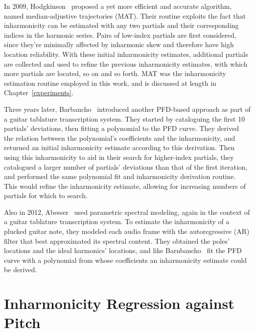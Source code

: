 \documentclass[12pt]{cmuthesis}
\begin{document}
In 2009, Hodgkinson~\cite{hodgkinson2009} proposed a yet more efficient and accurate algorithm, named median-adjustive trajectories (MAT). Their routine exploits the fact that inharmonicity can be estimated with any two partials and their corresponding indices in the harmonic series. Pairs of low-index partials are first considered, since they're minimally affected by inharmonic skew and therefore have high location reliability. With these initial inharmonicity estimates, additional partials are collected and used to refine the previous inharmonicity estimates, with which more partials are located, so on and so forth. MAT was the inharmonicity estimation routine employed in this work, and is discussed at length in Chapter~\ref{experiments}.

Three years later, Barbancho~\cite{barbanchoi2012} introduced another PFD-based approach as part of a guitar tablature transcription system. They started by cataloguing the first 10 partials' deviations, then fitting a polynomial to the PFD curve. They derived the relation between the polynomial's coefficients and the inharmonicity, and returned an initial inharmonicity estimate according to this derivation. Then using this inharmonicity to aid in their search for higher-index partials, they catalogued a larger number of partials' deviations than that of the first iteration, and performed the same polynomial fit and inharmonicity derivation routine. This would refine the inharmonicity estimate, allowing for increasing numbers of partials for which to search.

Also in 2012, Abesser~\cite{abesser2012} used parametric spectral modeling, again in the context of a guitar tablature transcription system. To estimate the inharmonicity of a plucked guitar note, they modeled each audio frame with the autoregressive (AR) filter that best approximated its spectral content. They obtained the poles' locations and the ideal harmonics' locations, and like Barnbancho~\cite{barbanchoi2012} fit the PFD curve with a polynomial from whose coefficients an inharmonicity estimate could be derived.



\noindent
\chapter{Inharmonicity Regression against Pitch}
\end{document}
